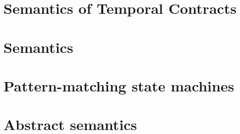 \FloatBarrier

\section{Semantics of Temporal Contracts} \label{sec:temporal-semantics}



\section{Semantics}\label{sec:technical}


\section{Pattern-matching state machines}
\FloatBarrier



\section{Abstract semantics}

